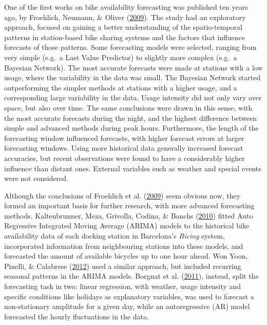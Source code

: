\documentclass[12pt,oneside]{reedthesis}
\begin{document}
One of the first works on bike availability forecasting was published
ten years ago, by Froehlich, Neumann, \& Oliver
(\protect\hyperlink{ref-froehlich2009}{2009}). The study had an
exploratory approach, focused on gaining a better understanding of the
spatio-temporal patterns in station-based bike sharing systems and the
factors that influence forecasts of those patterns. Some forecasting
models were selected, ranging from very simple (e.g.~a Last Value
Predictor) to slightly more complex (e.g.~a Bayesian Network). The most
accurate forecasts were made at stations with a low usage, where the
variability in the data was small. The Bayesian Network started
outperforming the simpler methods at stations with a higher usage, and a
corresponding large variability in the data. Usage intensity did not
only vary over space, but also over time. The same conclusions were
drawn in this sense, with the most accurate forecasts during the night,
and the highest difference between simple and advanced methods during
peak hours. Furthermore, the length of the forecasting window influenced
forecasts, with higher forecast errors at larger forecasting windows.
Using more historical data generally increased forecast accuracies, but
recent observations were found to have a considerably higher influence
than distant ones. External variables such as weather and special events
were not considered.

Although the conclusions of Froehlich et al.
(\protect\hyperlink{ref-froehlich2009}{2009}) seem obvious now, they
formed an important basis for further research, with more advanced
forecasting methods. Kaltenbrunner, Meza, Grivolla, Codina, \& Banchs
(\protect\hyperlink{ref-kaltenbrunner2010}{2010}) fitted Auto Regressive
Integrated Moving Average (ARIMA) models to the historical bike
availability data of each docking station in Barcelona's \emph{Bicing}
system, incorporated information from neighbouring stations into these
models, and forecasted the amount of available bicycles up to one hour
ahead. Won Yoon, Pinelli, \& Calabrese
(\protect\hyperlink{ref-won2012}{2012}) used a similar approach, but
included recurring seasonal patterns in the ARIMA models. Borgnat et al.
(\protect\hyperlink{ref-borgnat2011}{2011}), instead, split the
forecasting task in two: linear regression, with weather, usage
intensity and specific conditions like holidays as explanatory
variables, was used to forecast a non-stationary amplitude for a given
day, while an autoregressive (AR) model forecasted the hourly
fluctuations in the data.
\end{document}
